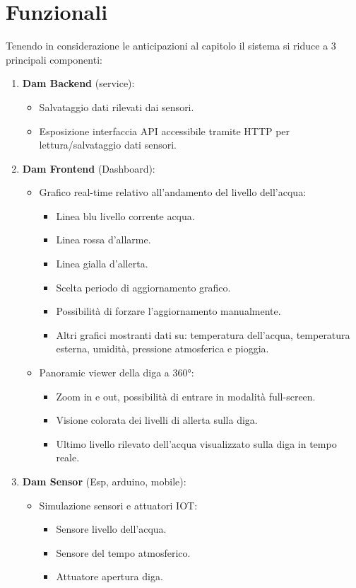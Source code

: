 \documentclass[a4paper,12pt]{report}
\begin{document}
\section{Funzionali}
Tenendo in considerazione le anticipazioni al capitolo  il sistema si riduce a 3 principali componenti:
\begin{enumerate}
	\item \textbf{Dam Backend} (service):
	\begin{itemize}
		\item Salvataggio dati rilevati dai sensori.
		\item Esposizione interfaccia API accessibile tramite HTTP per lettura/salvataggio dati sensori.
	\end{itemize} 
	\item \textbf{Dam Frontend} (Dashboard):
	\begin{itemize}
		\item Grafico real-time relativo all'andamento del livello dell'acqua:
		\begin{itemize}
			\item Linea blu livello corrente acqua.
			\item Linea rossa d'allarme.
			\item Linea gialla d'allerta.
			\item Scelta periodo di aggiornamento grafico.
			\item Possibilità di forzare l'aggiornamento manualmente.
			\item Altri grafici mostranti dati su: temperatura dell'acqua, temperatura esterna, umidità, pressione atmosferica e pioggia.
		\end{itemize}
		\item Panoramic viewer della diga a 360°:
		\begin{itemize}
			\item Zoom in e out, possibilità di entrare in modalità full-screen.
			\item Visione colorata dei livelli di allerta sulla diga.
			\item Ultimo livello rilevato dell'acqua visualizzato sulla diga in tempo reale.
		\end{itemize}
	\end{itemize}
	\item \textbf{Dam Sensor} (Esp, arduino, mobile):
	\begin{itemize}
		\item Simulazione sensori e attuatori IOT:
		\begin{itemize}
			\item Sensore livello dell'acqua.
			\item Sensore del tempo atmosferico.
			\item Attuatore apertura diga.
		\end{itemize}
	\end{itemize}
\end{enumerate}
\end{document}
